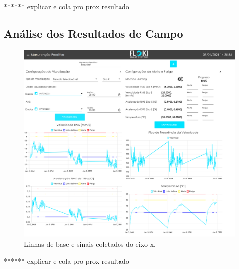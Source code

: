 ****** explicar e cola pro prox resultado

% 
\subsection{Análise dos Resultados de Campo}


\begin{figure}[H]
    \caption{Linhas de base e sinais coletados do eixo x.}
    \begin{center}
        \includegraphics[scale=.15]{resultados/img/drakkar_eixo_x.png}
    \end{center}
    \label{fig:ica}
\end{figure}

****** explicar e cola pro prox resultado

